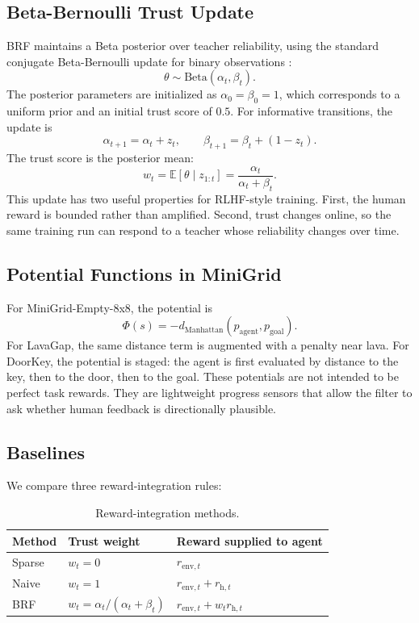 \documentclass[11pt]{article}
\begin{document}
\subsection{Beta-Bernoulli Trust Update}

BRF maintains a Beta posterior over teacher reliability, using the standard conjugate Beta-Bernoulli update for binary observations \cite{gelman2013bayesian}:
\[
\theta\sim\mathrm{Beta}(\alpha_t,\beta_t).
\]
The posterior parameters are initialized as $\alpha_0=\beta_0=1$, which corresponds to a uniform prior and an initial trust score of $0.5$. For informative transitions, the update is
\begin{equation}
\alpha_{t+1}=\alpha_t+z_t,\qquad
\beta_{t+1}=\beta_t+(1-z_t).
\end{equation}
The trust score is the posterior mean:
\begin{equation}
w_t = \mathbb{E}[\theta\mid z_{1:t}] =
\frac{\alpha_t}{\alpha_t+\beta_t}.
\label{eq:trust}
\end{equation}
This update has two useful properties for RLHF-style training. First, the human reward is bounded rather than amplified. Second, trust changes online, so the same training run can respond to a teacher whose reliability changes over time.

\subsection{Potential Functions in MiniGrid}

For MiniGrid-Empty-8x8, the potential is
\begin{equation}
\Phi(s)=-d_{\mathrm{Manhattan}}(p_{\mathrm{agent}},p_{\mathrm{goal}}).
\end{equation}
For LavaGap, the same distance term is augmented with a penalty near lava. For DoorKey, the potential is staged: the agent is first evaluated by distance to the key, then to the door, then to the goal. These potentials are not intended to be perfect task rewards. They are lightweight progress sensors that allow the filter to ask whether human feedback is directionally plausible.

\subsection{Baselines}

We compare three reward-integration rules:

\begin{table}[h]
\centering
\caption{Reward-integration methods.}
\label{tab:baselines}
\begin{tabular}{lll}
\toprule
Method & Trust weight & Reward supplied to agent \\
\midrule
Sparse & $w_t=0$ & $r_{\mathrm{env},t}$ \\
Naive & $w_t=1$ & $r_{\mathrm{env},t}+r_{\mathrm{h},t}$ \\
BRF & $w_t=\alpha_t/(\alpha_t+\beta_t)$ & $r_{\mathrm{env},t}+w_t r_{\mathrm{h},t}$ \\
\bottomrule
\end{tabular}
\end{table}
\end{document}
